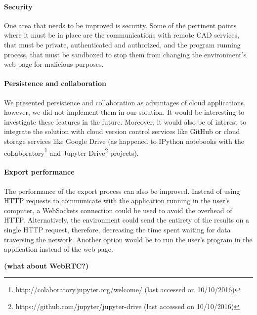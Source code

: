\paragraph{Security}
One area that needs to be improved is security.
Some of the pertinent points where it must be in place are the communications with remote CAD services, that must be private, authenticated and authorized, and the program running process, that must be sandboxed to stop them from changing the environment's web page for malicious purposes.

\paragraph{Persistence and collaboration}
We presented persistence and collaboration as advantages of cloud applications, however, we did not implement them in our solution.
It would be interesting to investigate these features in the future.
Moreover, it would also be of interest to integrate the solution with cloud version control services like GitHub or cloud storage services like Google Drive (as happened to IPython notebooks with the coLaboratory\footnote{http://colaboratory.jupyter.org/welcome/ (last accessed on 10/10/2016)} and Jupyter Drive\footnote{https://github.com/jupyter/jupyter-drive (last accessed on 10/10/2016)} projects).

\paragraph{Export performance}
The performance of the export process can also be improved.
Instead of using HTTP requests to communicate with the application running in the user's computer, a WebSockets connection\cite{rfc6455} could be used to avoid the overhead of HTTP.
Alternatively, the environment could send the entirety of the results on a single HTTP request, therefore, decreasing the time spent waiting for data traversing the network.
Another option would be to run the user's program in the application instead of the web page.

{\bf(what about WebRTC?)}








